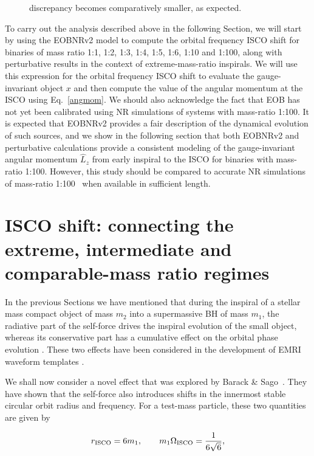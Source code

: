 \begin{figure}
{discrepancy becomes comparatively smaller, as expected. }
\label{emimcomp}
\end{figure}



To carry out the analysis described above in the following Section, we will start by using the EOBNRv2 model to compute the orbital frequency ISCO shift for binaries of mass ratio 1:1, 1:2, 1:3, 1:4, 1:5, 1:6, 1:10 and 1:100, along with perturbative results in the context of extreme-mass-ratio inspirals. We will use this expression for the orbital frequency ISCO shift  to evaluate the gauge-invariant object \(x\)  and then compute the value of the angular momentum at the ISCO using Eq.~\eqref{angmom}.  We should also acknowledge the fact that EOB has not yet been calibrated using NR simulations of systems with mass-ratio 1:100. It is expected that EOBNRv2 provides a fair description of the dynamical evolution of such sources,  and we show in the following section that both EOBNRv2 and perturbative calculations provide a consistent modeling of the gauge-invariant angular momentum \(\hat{L}_{z}\) from early inspiral to the ISCO for binaries with mass-ratio 1:100. However, this study should be 
compared to accurate NR simulations of mass-ratio 1:100~\cite{carlos} when available in sufficient length.




\section{ISCO shift: connecting the extreme, intermediate and comparable-mass ratio regimes}
\label{s3}

In the previous Sections we have mentioned that during the inspiral of a stellar mass compact object of mass \(m_2\) into a supermassive BH of mass \(m_1\), the radiative part of the self-force drives the inspiral evolution of the small object, whereas its conservative part has a cumulative effect on the orbital phase evolution \cite{SFB}. These two effects have been considered in the development of EMRI waveform templates  \cite{amos, cutler, gairles, kludge, improved, lisacapt, seoane}. 

We shall now consider a novel effect that was explored by Barack \& Sago~\cite{inner}. They have shown that the self-force also introduces shifts in the innermost stable circular orbit radius and frequency. For a test-mass particle, these two quantities are given by

\begin{equation}
r_{\rm ISCO} = 6m_1,  \qquad m_1\Omega_{\rm ISCO} = \frac{1}{6\sqrt{6}},
\label{tmpt}
\end{equation}


